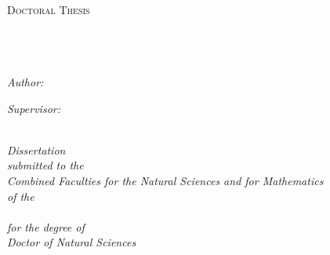 \documentclass[
11pt, %
english, %
singlespacing, %
headsepline, %
]{MastersDoctoralThesis} %
\author{Santiago \textsc{Casas Castro}} %
\begin{document}
\frontmatter %

\pagestyle{plain} %


\begin{titlepage}
\begin{center}

\textsc{\LARGE \univname}\\[1.5cm] %
\textsc{\Large Doctoral Thesis}\\[0.5cm] %

\HRule \\[0.4cm] %
{\huge \bfseries \ttitle}\\[0.4cm] %
\HRule \\[1.5cm] %
 
\begin{minipage}{0.4\textwidth}
\begin{flushleft} \large
\emph{Author:}\\
\href{http://www.thphys.uni-heidelberg.de/~casas/}{\authorname} %
\end{flushleft}
\end{minipage}
\begin{minipage}{0.4\textwidth}
\begin{flushright} \large
\emph{Supervisor:} \\
\href{https://valeriapettorino.wordpress.com/}{\supname} %
\end{flushright}
\end{minipage}\\[3cm]
 

\large 
\textit{Dissertation\\
submitted to the\\
Combined Faculties for the Natural Sciences and for Mathematics\\
of the} \\ 
\univname
\\[0.2cm]
\textit{for the degree of\\
Doctor of Natural Sciences} \\[2cm]
 

\end{center}
\end{titlepage}
\end{document}
